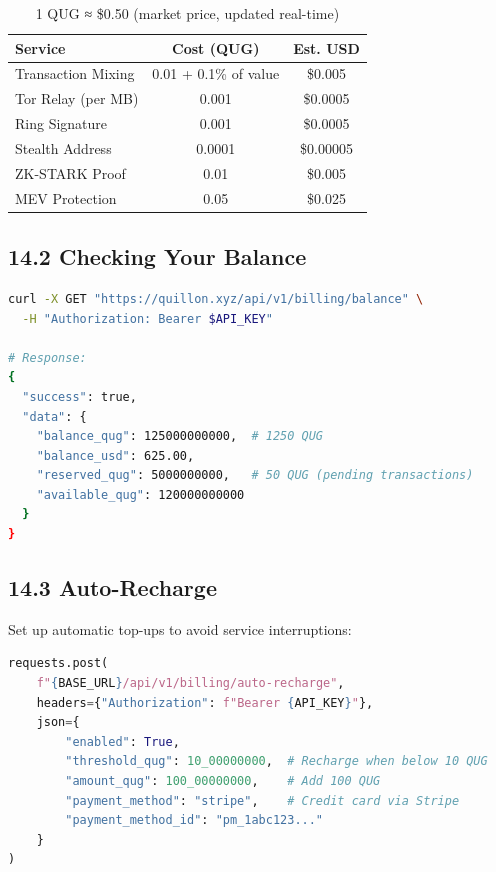 \documentclass[11pt,a4paper]{article}
\begin{document}
\begin{table}[h]
\centering
\begin{tabular}{lcc}
\toprule
\textbf{Service} & \textbf{Cost (QUG)} & \textbf{Est. USD} \\
\midrule
Transaction Mixing & 0.01 + 0.1\% of value & \$0.005 \\
Tor Relay (per MB) & 0.001 & \$0.0005 \\
Ring Signature & 0.001 & \$0.0005 \\
Stealth Address & 0.0001 & \$0.00005 \\
ZK-STARK Proof & 0.01 & \$0.005 \\
MEV Protection & 0.05 & \$0.025 \\
\bottomrule
\end{tabular}
\caption{1 QUG ≈ \$0.50 (market price, updated real-time)}
\end{table}

\subsection{14.2 Checking Your Balance}

\begin{lstlisting}[language=bash]
curl -X GET "https://quillon.xyz/api/v1/billing/balance" \
  -H "Authorization: Bearer $API_KEY"

# Response:
{
  "success": true,
  "data": {
    "balance_qug": 125000000000,  # 1250 QUG
    "balance_usd": 625.00,
    "reserved_qug": 5000000000,   # 50 QUG (pending transactions)
    "available_qug": 120000000000
  }
}
\end{lstlisting}

\subsection{14.3 Auto-Recharge}

Set up automatic top-ups to avoid service interruptions:

\begin{lstlisting}[language=python]
requests.post(
    f"{BASE_URL}/api/v1/billing/auto-recharge",
    headers={"Authorization": f"Bearer {API_KEY}"},
    json={
        "enabled": True,
        "threshold_qug": 10_00000000,  # Recharge when below 10 QUG
        "amount_qug": 100_00000000,    # Add 100 QUG
        "payment_method": "stripe",    # Credit card via Stripe
        "payment_method_id": "pm_1abc123..."
    }
)
\end{lstlisting}
\end{document}
